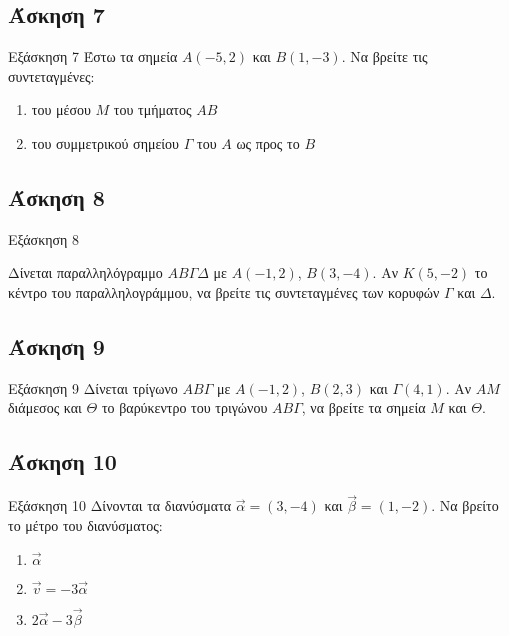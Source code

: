 \documentclass[greek]{beamer}
\begin{document}
\subsection{Άσκηση 7}
\begin{frame}[label=Άσκηση7,t]{Εξάσκηση 7}
      Έστω τα σημεία $Α(-5,2)$ και $Β(1,-3)$. Να βρείτε τις συντεταγμένες:
      \begin{enumerate}
            \item<1-> του μέσου $Μ$ του τμήματος $ΑΒ$
            \item<2-> του συμμετρικού σημείου $Γ$ του $Α$ ως προς το $Β$
      \end{enumerate}

\end{frame}

\subsection{Άσκηση 8}
\begin{frame}[label=Άσκηση8,t]{Εξάσκηση 8}

      Δίνεται παραλληλόγραμμο $ΑΒΓΔ$ με $Α(-1,2)$, $Β(3,-4)$. Αν $Κ(5,-2)$ το κέντρο του παραλληλογράμμου, να βρείτε τις συντεταγμένες των κορυφών $Γ$ και $Δ$.

\end{frame}

\subsection{Άσκηση 9}
\begin{frame}[label=Άσκηση9,t]{Εξάσκηση 9}
      Δίνεται τρίγωνο $ΑΒΓ$ με $Α(-1,2)$, $Β(2,3)$ και $Γ(4,1)$. Αν $ΑΜ$ διάμεσος και $Θ$ το βαρύκεντρο του τριγώνου $ΑΒΓ$, να βρείτε τα σημεία $Μ$ και $Θ$.
\end{frame}

\subsection{Άσκηση 10}
\begin{frame}[label=Άσκηση10,t]{Εξάσκηση 10}
      Δίνονται τα διανύσματα $\vec{α}=(3,-4)$ και $\vec{β}=(1,-2)$. Να βρείτο το μέτρο του διανύσματος:
      \begin{enumerate}
            \item<1-> $\vec{α}$
            \item<2-> $\vec{v}=-3\vec{α}$
            \item<3-> $2\vec{α}-3\vec{β}$
      \end{enumerate}
\end{frame}
\end{document}

